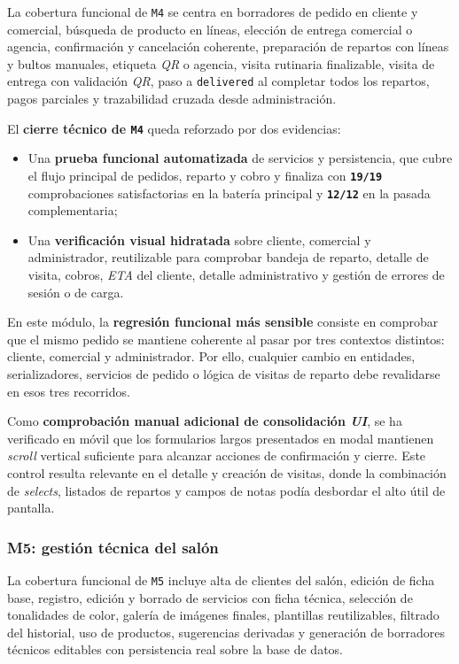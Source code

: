 La cobertura funcional de \texttt{M4} se centra en borradores de pedido en cliente y comercial, búsqueda de producto en líneas, elección de entrega comercial o agencia, confirmación y cancelación coherente, preparación de repartos con líneas y bultos manuales, etiqueta \textit{QR} o agencia, visita rutinaria finalizable, visita de entrega con validación \textit{QR}, paso a \texttt{delivered} al completar todos los repartos, pagos parciales y trazabilidad cruzada desde administración.

El \textbf{cierre técnico de \texttt{M4}} queda reforzado por dos evidencias:

\begin{itemize}
    \item Una \textbf{prueba funcional automatizada} de servicios y persistencia, que cubre el flujo principal de pedidos, reparto y cobro y finaliza con \textbf{\texttt{19/19}} comprobaciones satisfactorias en la batería principal y \textbf{\texttt{12/12}} en la pasada complementaria;
    \item Una \textbf{verificación visual hidratada} sobre cliente, comercial y administrador, reutilizable para comprobar bandeja de reparto, detalle de visita, cobros, \textit{ETA} del cliente, detalle administrativo y gestión de errores de sesión o de carga.
\end{itemize}

En este módulo, la \textbf{regresión funcional más sensible} consiste en comprobar que el mismo pedido se mantiene coherente al pasar por tres contextos distintos: cliente, comercial y administrador. Por ello, cualquier cambio en entidades, serializadores, servicios de pedido o lógica de visitas de reparto debe revalidarse en esos tres recorridos.

Como \textbf{comprobación manual adicional de consolidación \textit{UI}}, se ha verificado en móvil que los formularios largos presentados en modal mantienen \textit{scroll} vertical suficiente para alcanzar acciones de confirmación y cierre. Este control resulta relevante en el detalle y creación de visitas, donde la combinación de \textit{selects}, listados de repartos y campos de notas podía desbordar el alto útil de pantalla.

\subsubsection{M5: gestión técnica del salón}

La cobertura funcional de \texttt{M5} incluye alta de clientes del salón, edición de ficha base, registro, edición y borrado de servicios con ficha técnica, selección de tonalidades de color, galería de imágenes finales, plantillas reutilizables, filtrado del historial, uso de productos, sugerencias derivadas y generación de borradores técnicos editables con persistencia real sobre la base de datos.

